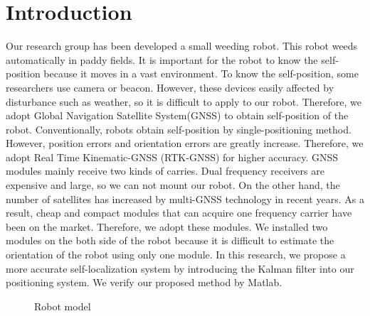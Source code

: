 \documentclass[a4paper]{article}
\begin{document}
\section{Introduction}
Our research group has been developed a small weeding robot\cite{aigamo}. This robot weeds automatically in paddy fields.
It is important for the robot to know the self-position because it moves in a vast environment. To know the self-position, 
some researchers use camera\cite{camera-relate} or beacon\cite{beacon-relate}. 
However, these devices easily affected by disturbance such as weather, so it is difficult to apply to our robot.
Therefore, we adopt Global Navigation Satellite System(GNSS) to obtain self-position of the robot.
Conventionally, robots obtain self-position by single-positioning method.
However, position errors and orientation errors are greatly increase.
Therefore, we adopt Real Time Kinematic-GNSS (RTK-GNSS) for higher accuracy.
GNSS modules mainly receive two kinds of carries.
Dual frequency receivers are expensive and large, so we can not mount our robot.
On the other hand, the number of satellites has increased by multi-GNSS technology in recent years. As a result, cheap and compact modules that can acquire one frequency carrier have been on the market.
Therefore, we adopt these modules.
We installed two modules on the both side of the robot because it is difficult to estimate the orientation of the robot using only one module.
In this research, we propose a more accurate self-localization system by introducing the Kalman filter into our positioning system.
We verify our proposed method by Matlab.

\begin{figure}
    \vspace{5mm}
    \centerline{}
    \caption{Robot model}
\end{figure}
\end{document}
